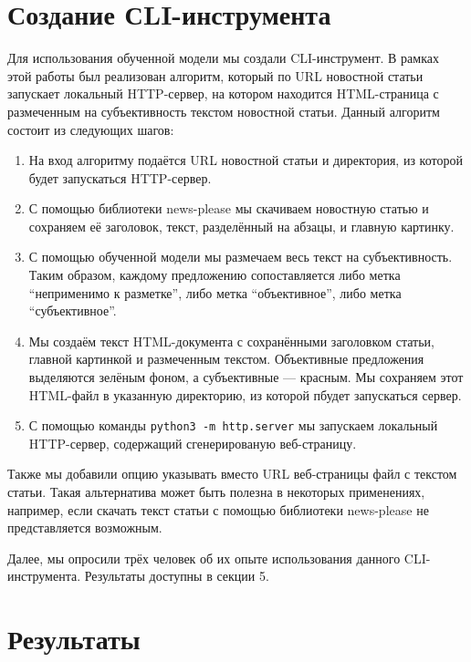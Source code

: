 \documentclass[a4paper,14pt]{extarticle}
\begin{document}
    \section{Создание СLI-инструмента}
    Для использования обученной модели мы создали CLI-инструмент. В рамках этой работы был реализован алгоритм, который по URL новостной статьи запускает локальный HTTP-сервер, на котором находится HTML-страница с размеченным на субъективность текстом новостной статьи. Данный алгоритм состоит из следующих шагов:
    \begin{enumerate}
        \item На вход алгоритму подаётся URL новостной статьи и директория, из которой будет запускаться HTTP-сервер.
        \item С помощью библиотеки news-please мы скачиваем новостную статью и сохраняем её заголовок, текст, разделённый на абзацы, и главную картинку.
        \item С помощью обученной модели мы размечаем весь текст на субъективность. Таким образом, каждому предложению сопоставляется либо метка ``неприменимо к разметке'', либо метка ``объективное'', либо метка ``субъективное''.
        \item Мы создаём текст HTML-документа с сохранёнными заголовком статьи, главной картинкой и размеченным текстом. Объективные предложения выделяются зелёным фоном, а субъективные --- красным. Мы сохраняем этот HTML-файл в указанную директорию, из которой пбудет запускаться сервер.
        \item С помощью команды \texttt{python3 -m http.server} мы запускаем локальный HTTP-сервер, содержащий сгенерированую веб-страницу.
    \end{enumerate}
    Также мы добавили опцию указывать вместо URL веб-страницы файл с текстом статьи. Такая альтернатива может быть полезна в некоторых применениях, например, если скачать текст статьи с помощью библиотеки news-please не представляется возможным. 
    
    Далее, мы опросили трёх человек об их опыте использования данного CLI-инструмента. Результаты доступны в секции 5.
    
    \section{Результаты}
\end{document}
